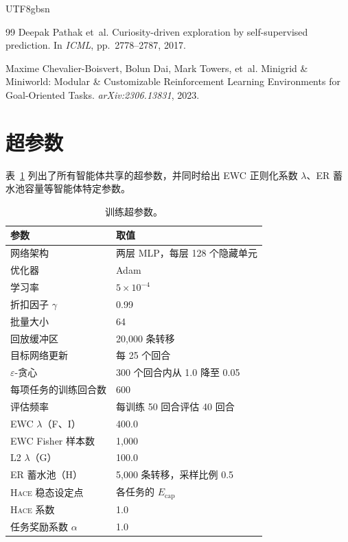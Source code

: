 \documentclass[sigplan,10pt]{acmart}
\newcommand{\energy}{E}
\newcommand{\hace}{\textsc{Hace}}
\begin{document}
\begin{CJK*}{UTF8}{gbsn}
\begin{thebibliography}{99}
Deepak Pathak et~al.
Curiosity-driven exploration by self-supervised prediction.
In \emph{ICML}, pp.\ 2778--2787, 2017.

Maxime Chevalier-Boisvert, Bolun Dai, Mark Towers, et~al.
Minigrid \& Miniworld: Modular \& Customizable Reinforcement Learning
  Environments for Goal-Oriented Tasks.
\emph{arXiv:2306.13831}, 2023.

\end{thebibliography}

\clearpage
\onecolumn
\appendix

\section{超参数}
\label{app:hyperparams}

表~\ref{tab:hyperparams} 列出了所有智能体共享的超参数，并同时给出 EWC 正则化系数
$\lambda$、ER 蓄水池容量等智能体特定参数。

\begin{table}[h]
\centering
\caption{训练超参数。}
\begin{tabular}{@{}ll@{}}
\toprule
\textbf{参数} & \textbf{取值} \\
\midrule
网络架构 & 两层 MLP，每层 128 个隐藏单元 \\
优化器 & Adam \\
学习率 & $5 \times 10^{-4}$ \\
折扣因子 $\gamma$ & 0.99 \\
批量大小 & 64 \\
回放缓冲区 & 20{,}000 条转移 \\
目标网络更新 & 每 25 个回合 \\
$\varepsilon$-贪心 & 300 个回合内从 1.0 降至 0.05 \\
每项任务的训练回合数 & 600 \\
评估频率 & 每训练 50 回合评估 40 回合 \\
\midrule
EWC $\lambda$（F、I） & 400.0 \\
EWC Fisher 样本数 & 1{,}000 \\
L2 $\lambda$（G） & 100.0 \\
ER 蓄水池（H） & 5{,}000 条转移，采样比例 0.5 \\
\hace{} 稳态设定点 & 各任务的 $\energy_{\text{cap}}$ \\
\hace{} 系数 & 1.0 \\
任务奖励系数 $\alpha$ & 1.0 \\
\bottomrule
\end{tabular}
\label{tab:hyperparams}
\end{table}



\end{CJK*}
\end{document}
